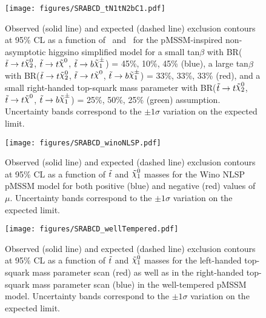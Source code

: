 \begin{figure}[h]
  \begin{center}
   \texttt{[image: figures/SRABCD\_tN1tN2bC1.pdf]}
    \caption[Exclusion contours for the pMSSM-inspired non-asymptotic higgsino simplified model.]{Observed (solid line) and expected (dashed line) exclusion contours at 95\% CL as a function of \mstop\ and \mLSP\ for the pMSSM-inspired non-asymptotic higgsino simplified model for a small tan$\beta$ with BR($\stop\to t\ninotwo$, $\stop\to t\LSP$, $\stop\to b\chinoonepm$) = 45\%, 10\%, 45\% (blue), a large tan$\beta$ with BR($\stop\to t\ninotwo$, $\stop\to t\LSP$, $\stop\to b\chinoonepm$) = 33\%, 33\%, 33\% (red), and a small right-handed top-squark mass parameter with BR($\stop\to t\ninotwo$, $\stop\to t\LSP$, $\stop\to b\chinoonepm$) = 25\%, 50\%, 25\% (green) assumption. Uncertainty bands correspond to the $\pm 1 \sigma$ variation on the expected limit.}
    \label{fig:nonAsymhiggsino_exclusion}
  \end{center}
\end{figure}
\clearpage

\begin{figure}[h]
  \begin{center}
    \texttt{[image: figures/SRABCD\_winoNLSP.pdf]}
    \caption[Exclusion contours for the Wino NLSP pMSSM model.]{Observed (solid line) and expected (dashed line) exclusion contours at 95\% CL as a function of $\tilde{t}$ and $\ninoone$ masses for the Wino NLSP pMSSM model for both positive (blue) and negative (red) values of $\mu$. Uncertainty bands correspond to the $\pm 1 \sigma$ variation on the expected limit. %
    }
    \label{fig:winoNLSP_exclusion}
  \end{center}
\end{figure}


\begin{figure}[h]
  \begin{center}
    \texttt{[image: figures/SRABCD\_wellTempered.pdf]}
    \caption[Exclusion contour for the well-tempered pMSSM model.]{Observed (solid line) and expected (dashed line) exclusion contours at 95\% CL as a function of $\tilde{t}$ and $\ninoone$ masses for the left-handed top-squark mass parameter scan (red) as well as in the right-handed top-squark mass parameter scan (blue) in the well-tempered pMSSM model. Uncertainty bands correspond to the $\pm 1 \sigma$ variation on the expected limit.} 
    \label{fig:wellTemp_exclusion}
  \end{center}
\end{figure}




